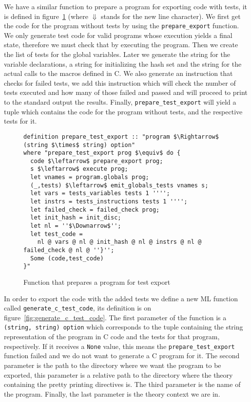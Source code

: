 We have a similar function to prepare a program for exporting code with tests, it is defined in figure~\ref{fig:prepare_test_export} (where $\Downarrow$ stands for the new line character).
We first get the code for the program without tests by using the \verb|prepare_export| function.
We only generate test code for valid programs whose execution yields a final state, therefore we must check that by executing the program.
Then we create the list of tests for the global variables.
Later we generate the string for the variable declarations, a string for initializing the hash set and the string for the actual calls to the macros defined in C.
We also generate an instruction that checks for failed tests, we add this instruction which will check the number of tests executed and how many of those failed and passed and will proceed to print to the standard output the results.
Finally, \verb|prepare_test_export| will yield a tuple which contains the code for the program without tests, and the respective tests for it.

\begin{figure}
\begin{lstlisting}[mathescape=true]
definition prepare_test_export :: "program $\Rightarrow$ (string $\times$ string) option"
where "prepare_test_export prog $\equiv$ do {
  code $\leftarrow$ prepare_export prog;
  s $\leftarrow$ execute prog;
  let vnames = program.globals prog;
  (_,tests) $\leftarrow$ emit_globals_tests vnames s;
  let vars = tests_variables tests 1 '''';
  let instrs = tests_instructions tests 1 '''';
  let failed_check = failed_check prog;
  let init_hash = init_disc;
  let nl = ''$\Downarrow$'';
  let test_code =
    nl @ vars @ nl @ init_hash @ nl @ instrs @ nl @ failed_check @ nl @ ''}'';
  Some (code,test_code)
}"
\end{lstlisting}

\caption{Function that prepares a program for test export}
\label{fig:prepare_test_export}
\end{figure}


In order to export the code with the added tests we define a new ML function called \verb|generate_c_test_code|, its definition is on figure~\ref{fig:generate_c_test_code}.
The first parameter of the function is a \verb|(string, string) option| which corresponds to the tuple containing the string representation of the program in C code and the tests for that program, respectively.
If it receives a \verb|None| value, this means the \verb|prepare_test_export| function failed and we do not want to generate a C program for it.
The second parameter is the path to the directory where we want the program to be exported, this parameter is a relative path to the directory where the theory containing the pretty printing directives is.
The third parameter is the name of the program.
Finally, the last parameter is the theory context we are in.

